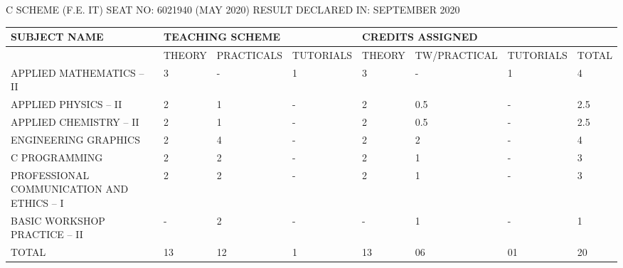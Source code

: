 \documentclass{article} %
\begin{document}
\noindent \textbf{} C SCHEME (F.E. IT)         SEAT NO: 6021940 (MAY 2020)           RESULT DECLARED IN: SEPTEMBER 2020

\noindent 

\noindent 

\begin{tabular}{|p{1.0in}|p{0.4in}|p{0.6in}|p{0.5in}|p{0.4in}|p{0.5in}|p{0.5in}|p{0.4in}|} \hline 
SUBJECT NAME & \multicolumn{3}{|p{1.5in}|}{TEACHING SCHEME} & \multicolumn{4}{|p{1.8in}|}{CREDITS ASSIGNED} \\ \hline 
 & THEORY & PRACTICALS & TUTORIALS & THEORY & TW/\newline PRACTICAL & TUTORIALS & TOTAL \\ \hline 
APPLIED MATHEMATICS -- II & 3 & - & 1 & 3 & - & 1 & 4 \\ \hline 
APPLIED PHYSICS -- II & 2 & 1 & - & 2 & 0.5 & - & 2.5 \\ \hline 
APPLIED CHEMISTRY -- II & 2 & 1 & - & 2 & 0.5 & - & 2.5 \\ \hline 
ENGINEERING GRAPHICS & 2 & 4 & - & 2 & 2 & - & 4 \\ \hline 
C PROGRAMMING & 2 & 2 & - & 2 & 1 & - & 3 \\ \hline 
\newline PROFESSIONAL COMMUNICATION AND ETHICS -- I & 2 & 2 & - & 2 & 1 & - & 3 \\ \hline 
\newline BASIC WORKSHOP PRACTICE -- II\newline  & - & 2 & - & - & 1 & - & 1 \\ \hline 
TOTAL & 13 & 12 & 1 & 13 & 06 & 01 & 20 \\ \hline 
\end{tabular}



\noindent 

\noindent 

\noindent 

\noindent 

\noindent 

\noindent 

\noindent 

\noindent 

\noindent 

\noindent 

\noindent 

\noindent 

\noindent 

\noindent 
\end{document}
